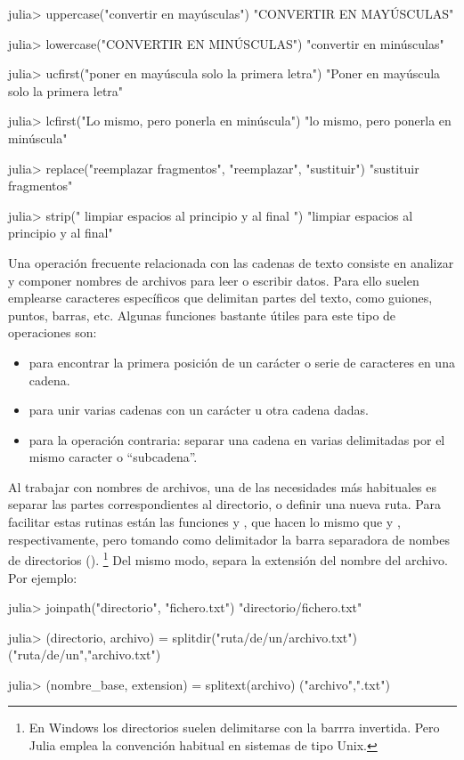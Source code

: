 \begin{jlconcode}
julia> uppercase("convertir en mayúsculas")
"CONVERTIR EN MAYÚSCULAS"

julia> lowercase("CONVERTIR EN MINÚSCULAS")
"convertir en minúsculas"

julia> ucfirst("poner en mayúscula solo la primera letra")
"Poner en mayúscula solo la primera letra"

julia> lcfirst("Lo mismo, pero ponerla en minúscula")
"lo mismo, pero ponerla en minúscula"

julia> replace("reemplazar fragmentos", "reemplazar", "sustituir")
"sustituir fragmentos"

julia> strip("   limpiar espacios al principio y al final   ")
"limpiar espacios al principio y al final"
\end{jlconcode}

Una operación frecuente relacionada con las cadenas de texto consiste en analizar y componer nombres de archivos para leer o escribir datos. Para ello suelen emplearse caracteres específicos que delimitan partes del texto, como guiones, puntos, barras, etc. Algunas funciones bastante útiles para este tipo de operaciones son:

\begin{itemize}
  \item {} para encontrar la primera posición de un carácter o serie de caracteres en una cadena.
  \item {} para unir varias cadenas con un carácter u otra cadena dadas.
  \item {} para la operación contraria: separar una cadena en varias delimitadas por el mismo caracter o ``subcadena''.
\end{itemize}

Al trabajar con nombres de archivos, una de las necesidades más habituales es separar las partes correspondientes al directorio, o definir una nueva ruta. Para facilitar estas rutinas están las funciones  y , que hacen lo mismo que  y , respectivamente, pero tomando como delimitador la barra separadora de nombes de directorios (\code{/}).%
\footnote{%
En Windows los directorios suelen delimitarse con la barrra invertida. Pero Julia emplea la convención habitual en sistemas de tipo Unix.%
}
Del mismo modo,  separa la extensión del nombre del archivo. Por ejemplo:

\begin{jlconcode}
julia> joinpath("directorio", "fichero.txt")
"directorio/fichero.txt"

julia> (directorio, archivo) = splitdir("ruta/de/un/archivo.txt")
("ruta/de/un","archivo.txt")

julia> (nombre_base, extension) = splitext(archivo)
("archivo",".txt")
\end{jlconcode}

